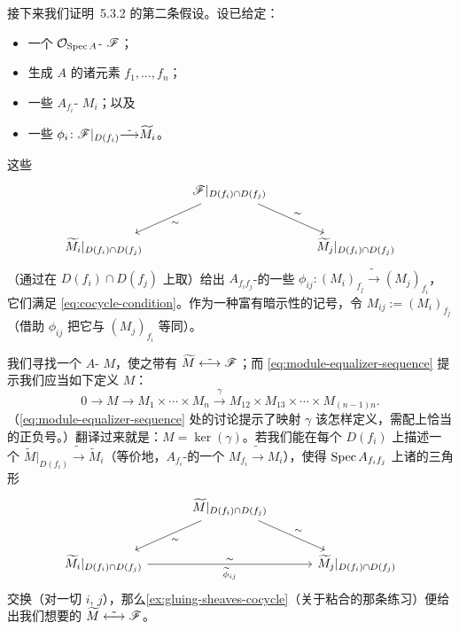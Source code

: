 接下来我们证明\trAffineCommunicationLemma{}~5.3.2 的第二条假设。设已给定：
\begin{itemize}
\item 一个 $\mathcal{O}_{\operatorname{Spec} A}$-\trModule{} $\mathscr{F}$；
\item 生成 $A$ 的诸元素 $f_1,\dots,f_n$；
\item 一些 $A_{f_i}$-\trModule{} $M_i$；以及
\item 一些\trIsomorphism{} $\phi_i\colon\mathscr{F}|_{D(f_i)}\tilde{\longrightarrow}\widetilde{M}_i$。
\end{itemize}
这些\trIsomorphism
\[
\begin{tikzcd}[row sep=2.4em, column sep=3.2em]
 & \scr{F}|_{D(f_i)\cap D(f_j)} \ar[dl,"\sim"] \ar[dr,"\sim"] \\
\widetilde{M}_i|_{D(f_i)\cap D(f_j)} & & \widetilde{M}_j|_{D(f_i)\cap D(f_j)}
\end{tikzcd}
\]
（通过在 $D(f_i)\cap D(f_j)$ 上取\trSection）给出 $A_{f_if_j}$-\trModule{}的一些\trIsomorphism{} $\phi_{ij}\colon(M_i)_{f_j}\tilde{\longrightarrow}(M_j)_{f_i}$，它们满足\trCocycleCondition{} \eqref{eq:cocycle-condition}。作为一种富有暗示性的记号，令 $M_{ij}:=(M_i)_{f_j}$（借助 $\phi_{ij}$ 把它与 $(M_j)_{f_i}$ 等同）。

我们寻找一个 $A$-\trModule{} $M$，使之带有\trIsomorphism{} $\widetilde{M}\;\tilde{\longleftrightarrow}\;\mathscr{F}$；而 \eqref{eq:module-equalizer-sequence} 提示我们应当如下定义 $M$：
\begin{equation*}\tag{6.1.2.1}\label{eq:m-equalizer-definition}
0\longrightarrow M\longrightarrow M_1\times\cdots\times M_n\overset{\gamma}{\longrightarrow}M_{12}\times M_{13}\times\cdots\times M_{(n-1)n}.
\end{equation*}
（\eqref{eq:module-equalizer-sequence} 处的讨论提示了映射 $\gamma$ 该怎样定义，需配上恰当的正负号。）翻译过来就是：$M=\ker(\gamma)$。若我们能在每个 $D(f_i)$ 上描述一个\trIsomorphism{} $\widetilde{M}|_{D(f_i)}\tilde{\longrightarrow}\widetilde{M}_i$（等价地，$A_{f_i}$-\trModule{}的一个\trIsomorphism{} $M_{f_i}\tilde{\longrightarrow}M_i$），使得 $\operatorname{Spec} A_{f_if_j}$ 上诸\trSheaf{}的三角形
\[
\begin{tikzcd}[row sep=2.4em, column sep=3.2em]
 & \widetilde{M}|_{D(f_i)\cap D(f_j)} \ar[dl,"\sim"] \ar[dr,"\sim"] \\
\widetilde{M}_i|_{D(f_i)\cap D(f_j)} \ar[rr,"\widetilde{\phi}_{ij}"',"\sim"] & & \widetilde{M}_j|_{D(f_i)\cap D(f_j)}
\end{tikzcd}
\]
交换（对一切 $i$, $j$），那么\cref{ex:gluing-sheaves-cocycle}（关于粘合\trSheaf{}的那条练习）便给出我们想要的\trIsomorphism{} $\widetilde{M}\;\tilde{\longleftrightarrow}\;\mathscr{F}$。

